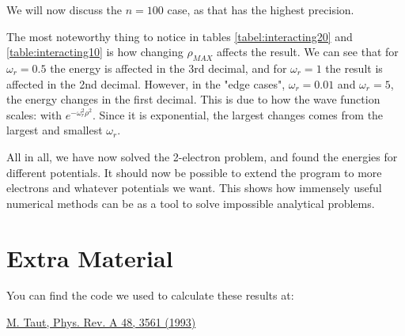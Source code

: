 \documentclass[10pt,showpacs,preprintnumbers,footinbib,amsmath,amssymb,aps,prl,twocolumn,groupedaddress,superscriptaddress,showkeys]{revtex4-1}
\begin{document}
We will now discuss the $n = 100$ case, as that has the highest precision.

The most noteworthy thing to notice in tables \ref{tabel:interacting20} and \ref{table:interacting10}  is how changing $\rho_{MAX}$ affects the result. We can see that for $\omega_r = 0.5$ the energy is affected in the 3rd decimal, and for $\omega_r = 1$ the result is affected in the 2nd decimal. However, in the "edge cases", $\omega_r = 0.01$ and $\omega_r = 5$, the energy changes in the first decimal. This is due to how the wave function scales: with $e^{-\omega_r^2\rho^2}$. Since it is exponential, the largest changes comes from the largest and smallest $\omega_r$. 

All in all, we have now solved the 2-electron problem, and found the energies for different potentials. It should now be possible to extend the program to more electrons and whatever potentials we want. This shows how immensely useful numerical methods can be as a tool to solve impossible analytical problems.



\section{Extra Material}
You can find the code we used to calculate these results at: 

\begin{thebibliography}{99}
\href{http://prola.aps.org/abstract/PRA/v48/i5/p3561_1}{M. Taut, Phys. Rev. A 48, 3561 (1993)}
\end{thebibliography}
\end{document}
